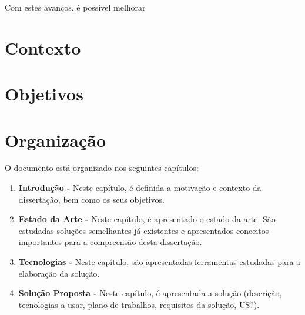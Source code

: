 Com estes avanços, é possível melhorar

\section{Contexto}
\label{sec:context}

\section{Objetivos}
\label{sec:objetivos}

\section{Organização}
\label{sec:organization}

O documento está organizado nos seguintes capítulos:
\begin{enumerate}
  \item \textbf{Introdução - } Neste capítulo, é definida a motivação e contexto da dissertação, bem como os seus objetivos.
  \item \textbf{Estado da Arte - } Neste capítulo, é apresentado o estado da arte. São estudadas soluções semelhantes já existentes e apresentados conceitos importantes para a compreensão desta dissertação.
  \item \textbf{Tecnologias - } Neste capítulo, são apresentadas ferramentas estudadas para a elaboração da solução.   
  \item \textbf{Solução Proposta - } Neste capítulo, é apresentada a solução (descrição, tecnologias a usar, plano de trabalhos, requisitos da solução, US?).
\end{enumerate}

